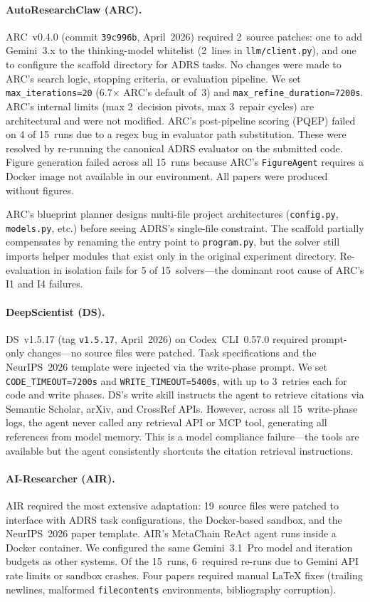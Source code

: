 \paragraph{AutoResearchClaw (ARC).}
ARC~v0.4.0 (commit \texttt{39c996b}, April~2026) required 2~source patches: one to add Gemini~3.x to the thinking-model whitelist (2~lines in \texttt{llm/client.py}), and one to configure the scaffold directory for ADRS tasks.
No changes were made to ARC's search logic, stopping criteria, or evaluation pipeline.
We set \texttt{max\_iterations=20} (6.7$\times$ ARC's default of~3) and \texttt{max\_refine\_duration=7200s}.
ARC's internal limits (max 2~decision pivots, max 3~repair cycles) are architectural and were not modified.
ARC's post-pipeline scoring (PQEP) failed on 4 of 15~runs due to a regex bug in evaluator path substitution. These were resolved by re-running the canonical ADRS evaluator on the submitted code.
Figure generation failed across all 15~runs because ARC's \texttt{FigureAgent} requires a Docker image not available in our environment. All papers were produced without figures.

ARC's blueprint planner designs multi-file project architectures (\texttt{config.py}, \texttt{models.py}, etc.) before seeing ADRS's single-file constraint.
The scaffold partially compensates by renaming the entry point to \texttt{program.py}, but the solver still imports helper modules that exist only in the original experiment directory.
Re-evaluation in isolation fails for 5 of 15~solvers---the dominant root cause of ARC's I1 and I4 failures.

\paragraph{DeepScientist (DS).}
DS~v1.5.17 (tag \texttt{v1.5.17}, April~2026) on Codex~CLI~0.57.0 required prompt-only changes---no source files were patched.
Task specifications and the NeurIPS~2026 template were injected via the write-phase prompt.
We set \texttt{CODE\_TIMEOUT=7200s} and \texttt{WRITE\_TIMEOUT=5400s}, with up to 3~retries each for code and write phases.
DS's write skill instructs the agent to retrieve citations via Semantic Scholar, arXiv, and CrossRef APIs. However, across all 15~write-phase logs, the agent never called any retrieval API or MCP tool, generating all references from model memory.
This is a model compliance failure---the tools are available but the agent consistently shortcuts the citation retrieval instructions.

\paragraph{AI-Researcher (AIR).}
AIR required the most extensive adaptation: 19~source files were patched to interface with ADRS task configurations, the Docker-based sandbox, and the NeurIPS~2026 paper template.
AIR's MetaChain ReAct agent runs inside a Docker container. We configured the same Gemini~3.1~Pro model and iteration budgets as other systems.
Of the 15~runs, 6~required re-runs due to Gemini API rate limits or sandbox crashes. Four papers required manual \LaTeX{} fixes (trailing newlines, malformed \texttt{filecontents} environments, bibliography corruption).


